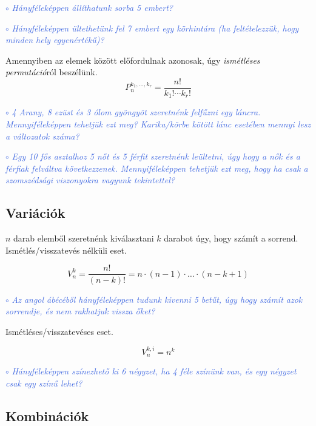 \documentclass[a4paper]{article}
\newenvironment{task}[1]
{\noindent\textcolor{RoyalBlue}{$\circ$ \textit{#1}}

\smallskip

\color{Gray}

}{\bigskip}
\begin{document}
\begin{task}{Hányféleképpen állíthatunk sorba 5 embert?}
\end{task}

\begin{task}{Hányféleképpen ültethetünk fel 7 embert egy körhintára (ha feltételezzük, hogy minden hely egyenértékű)?}
\end{task}

Amennyiben az elemek között előfordulnak azonosak, úgy \textit{ismétléses permutáció}ról beszélünk.
\[
P_{n}^{k_1, \ldots, k_r} = \dfrac{n!}{k_1! \cdots k_r!}
\]

\begin{task}{4 Arany, 8 ezüst és 3 ólom gyöngyöt szeretnénk felfűzni egy láncra. Mennyiféleképpen tehetjük ezt meg? Karika/körbe kötött lánc esetében mennyi lesz a változatok száma?}
\end{task}

\begin{task}{Egy 10 fős asztalhoz 5 nőt és 5 férfit szeretnénk leültetni, úgy hogy a nők és a férfiak felváltva következzenek. Mennyiféleképpen tehetjük ezt meg, hogy ha csak a szomszédsági viszonyokra vagyunk tekintettel?}
\end{task}

\subsection{Variációk}

$n$ darab elemből szeretnénk kiválasztani $k$ darabot úgy, hogy számít a sorrend.
Ismétlés/visszatevés nélküli eset.

\[
V_{n}^{k} = \dfrac{n!}{(n - k)!} = n \cdot (n - 1) \cdot \ldots \cdot (n - k + 1)
\]

\begin{task}{Az angol ábécéből hányféleképpen tudunk kivenni 5 betűt, úgy hogy számít azok sorrendje, és nem rakhatjuk vissza őket?}
\end{task}

Ismétléses/visszatevéses eset.

\[
V_{n}^{k, i} = n^k
\]

\begin{task}{Hányféleképpen színezhető ki 6 négyzet, ha 4 féle színünk van, és egy négyzet csak egy színű lehet?}
\end{task}

\subsection{Kombinációk}
\end{document}
